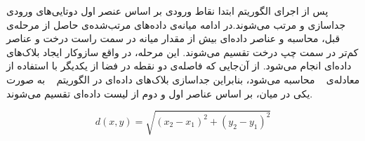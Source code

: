 پس از اجرای الگوریتم ابتدا نقاط ورودی بر اساس عنصر اول دوتایی‌های ورودی جداسازی و مرتب‌ می‌شوند.در ادامه میانه‌ی داده‌‌های مرتب‌شده‌ی حاصل از مرحله‌ی قبل، محاسبه و عناصر داده‌ای بیش از مقدار میانه در سمت راست درخت و عناصر کم‌تر در سمت چپ درخت تقسیم می‌شوند. این مرحله‌، در واقع سازو‌کار ایجاد بلاک‌های داده‌ای انجام می‌شود. از آن‌جایی که فاصله‌ی دو نقطه در فضا از یکدیگر با استفاده از معادله‌ی ~ محاسبه می‌شود، بنابراین جداسازی بلاک‌های داده‌ای در الگوریتم ~ به صورت یکی در میان، بر اساس عناصر اول و دوم از لیست داده‌ای تقسیم می‌شوند.

\begin{equation}
	d(x,y)=\sqrt{(x_{2}-x_{1})^2 + (y_{2}-y_{1})^2} \label{eq:1}
\end{equation}


